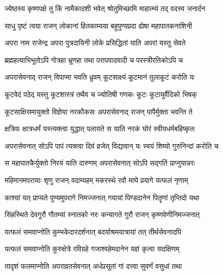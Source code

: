 \label{sec:padma-jyeshtha-krishnapara}

\ganapatyadiDhyanam
\padmaPuranam



\twolineshloka
{ज्येष्ठस्य कृष्णपक्षे तु किं नामैकादशी भवेत्}
{श्रोतुमिच्छामि माहात्म्यं तद् वदस्व जनार्दन}%


\twolineshloka
{साधु पृष्टं त्वया राजन् लोकानां हितकाम्यया}
{बहुपुण्यप्रदा ह्येषा महापातकनाशिनी}%

\twolineshloka
{अपरा नाम राजेन्द्र अपरा पुत्रदायिनी}
{लोके प्रसिद्धितां याति अपरां यस्तु सेवते}%

\twolineshloka
{ब्रह्महत्याभिभूतोऽपि गोत्रहा भ्रूणहा तथा}
{परापवादवादी च परस्त्रीरतिकोऽपि च}%

\twolineshloka
{अपरासेवनाद् राजन् विपाप्मा भवति ध्रुवम्}
{कूटसाक्ष्यं कूटमानं तुलाकूटं करोति यः}%

\twolineshloka
{कूटवेदं पठेद् यस्तु कूटशास्त्रं तथैव च}
{ज्योतिषी गणकः कूटः कूटायुर्वैदिको भिषक्}%

\twolineshloka
{कूटसाक्षिसमायुक्तो विज्ञेया नरकौकसः}
{अपरासेवनाद् राजन् पापैर्मुक्ता भवन्ति ते}%

\twolineshloka
{क्षत्रियः क्षात्रधर्मं यस्त्यक्त्वा युद्धात् पलायते}
{स याति नरकं घोरं स्वीयधर्मबहिष्कृतः}%

\twolineshloka
{अपरासेवनात् सोऽपि पापं त्यक्त्वा दिवं व्रजेत्}
{विद्यावान् यः स्वयं शिष्यो गुरुनिन्दां करोति च}%

\twolineshloka
{स महापातकैर्युक्तो निरयं याति दारुणम्}
{अपरासेवनात् सोऽपि सद्गतिं प्राप्नुयान्नरः}%

\twolineshloka
{महिमानमपरायाः शृणु राजन् वदाम्यहम्}
{मकरस्थे रवौ माघे प्रयागे यत्फलं नृणाम्}%

\twolineshloka
{काश्यां यत् प्राप्यते पुण्यमुपरागे निमज्जनात्}
{गयायां पिण्डदानेन पितॄणां तृप्तिदो यथा}%

\twolineshloka
{सिंहस्थिते देवगुरौ गौतम्यां स्नातको नरः}
{कन्यागते गुरौ राजन् कृष्णवेणीनिमज्जनात्}%

\twolineshloka
{यत्फलं समवाप्नोति कुम्भकेदारदर्शनात्}
{बदर्याश्रमयात्रायां तत् तीर्थसेवनादपि}%

\twolineshloka
{यत्फलं समवाप्नोति कुरुक्षेत्रे रविग्रहे}
{गजाश्वहेमदानेन यज्ञं कृत्वा सदक्षिणम्}%

\twolineshloka
{तादृशं फलमाप्नोति अपराव्रतसेवनात्}
{अर्धप्रसूतां गां दत्त्वा सुवर्णं वसुधां तथा}%


